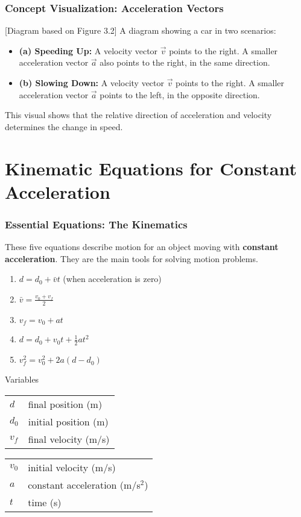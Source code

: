 \documentclass{beamer}
\begin{document}
\begin{frame}
\frametitle{Concept Visualization: Acceleration Vectors}
\begin{alertblock}{[Diagram based on Figure 3.2]}
A diagram showing a car in two scenarios:
\begin{itemize}
    \item \textbf{(a) Speeding Up:} A velocity vector $\vec{v}$ points to the right. A smaller acceleration vector $\vec{a}$ also points to the right, in the same direction.
    \pause
    \item \textbf{(b) Slowing Down:} A velocity vector $\vec{v}$ points to the right. A smaller acceleration vector $\vec{a}$ points to the left, in the opposite direction.
\end{itemize}
This visual shows that the relative direction of acceleration and velocity determines the change in speed.
\end{alertblock}
\end{frame}

\section{Kinematic Equations for Constant Acceleration}

\begin{frame}
\frametitle{Essential Equations: The Kinematics}
These five equations describe motion for an object moving with \textbf{constant acceleration}. They are the main tools for solving motion problems.
\pause
\begin{enumerate}
    \item $d = d_0 + \bar{v}t$ \quad (when acceleration is zero)
    \pause
    \item $\bar{v} = \frac{v_0 + v_f}{2}$
    \pause
    \item $v_f = v_0 + at$
    \pause
    \item $d = d_0 + v_0 t + \frac{1}{2}at^2$
    \pause
    \item $v_f^2 = v_0^2 + 2a(d - d_0)$
\end{enumerate}
\pause
\begin{block}{Variables}
\begin{tabular}{ll}
    $d$ & final position (m) \\
    $d_0$ & initial position (m) \\
    $v_f$ & final velocity (m/s) \\
\end{tabular}
\quad
\begin{tabular}{ll}
    $v_0$ & initial velocity (m/s) \\
    $a$ & constant acceleration (m/s$^2$) \\
    $t$ & time (s) \\
\end{tabular}
\end{block}
\end{frame}
\end{document}
